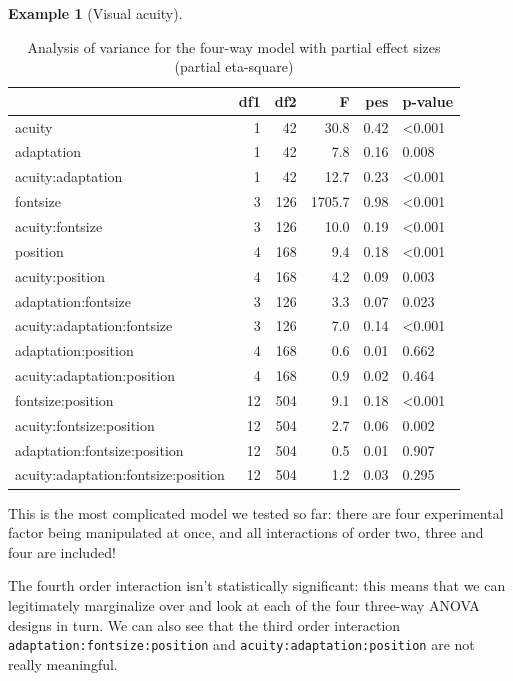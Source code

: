 \documentclass[
  11pt,
  letterpaper,
]{scrbook}
\theoremstyle{definition}
\theoremstyle{definition}
\newtheorem{example}{Example}[chapter]
\theoremstyle{remark}
\begin{document}
\begin{example}[Visual
acuity]
\begin{longtable}[t]{lrrrrl}
\caption{\label{tbl-anova-fourway}Analysis of variance for the four-way
model with partial effect sizes (partial eta-square)}

\tabularnewline

\toprule
 & df1 & df2 & F & pes & p-value\\
\midrule
acuity & 1 & 42 & 30.8 & 0.42 & <0.001\\
adaptation & 1 & 42 & 7.8 & 0.16 & 0.008\\
acuity:adaptation & 1 & 42 & 12.7 & 0.23 & <0.001\\
fontsize & 3 & 126 & 1705.7 & 0.98 & <0.001\\
acuity:fontsize & 3 & 126 & 10.0 & 0.19 & <0.001\\
\addlinespace
position & 4 & 168 & 9.4 & 0.18 & <0.001\\
acuity:position & 4 & 168 & 4.2 & 0.09 & 0.003\\
adaptation:fontsize & 3 & 126 & 3.3 & 0.07 & 0.023\\
acuity:adaptation:fontsize & 3 & 126 & 7.0 & 0.14 & <0.001\\
adaptation:position & 4 & 168 & 0.6 & 0.01 & 0.662\\
\addlinespace
acuity:adaptation:position & 4 & 168 & 0.9 & 0.02 & 0.464\\
fontsize:position & 12 & 504 & 9.1 & 0.18 & <0.001\\
acuity:fontsize:position & 12 & 504 & 2.7 & 0.06 & 0.002\\
adaptation:fontsize:position & 12 & 504 & 0.5 & 0.01 & 0.907\\
acuity:adaptation:fontsize:position & 12 & 504 & 1.2 & 0.03 & 0.295\\
\bottomrule

\end{longtable}

This is the most complicated model we tested so far: there are four
experimental factor being manipulated at once, and all interactions of
order two, three and four are included!

The fourth order interaction isn't statistically significant: this means
that we can legitimately marginalize over and look at each of the four
three-way ANOVA designs in turn. We can also see that the third order
interaction \texttt{adaptation:fontsize:position} and
\texttt{acuity:adaptation:position} are not really meaningful.


\end{example}
\end{document}
